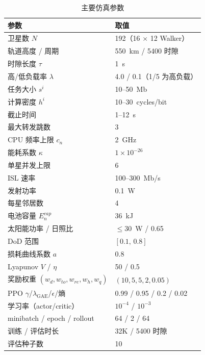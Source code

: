 \documentclass[a4paper,11pt]{article}
\begin{document}
\begin{table}[t]
\centering
\caption{主要仿真参数}
\label{tab:sim_params}
\begin{tabular}{ll}
\hline
参数 & 取值 \\
\hline
卫星数 $N$ & 192（16 $\times$ 12 Walker）\\
轨道高度 / 周期 & 550~km / 5400 时隙 \\
时隙长度 $\tau$ & 1~s \\
高/低负载率 $\lambda$ & 4.0 / 0.1（1/5 为高负载）\\
任务大小 $s^i$ & 10--50~Mb \\
计算密度 $h^i$ & 10--30~cycles/bit~\cite{zhang2024mhspo} \\
截止时间 & 1--12~s \\
最大转发跳数 & 3 \\
CPU 频率上限 $c_n$ & 2~GHz~\cite{zhang2024mhspo} \\
能耗系数 $\kappa$ & $1\times10^{-26}$~\cite{zhang2024mhspo} \\
单星并发上限 & 6 \\
ISL 速率 & 100--300~Mb/s \\
发射功率 & 0.1~W \\
每星邻居数 & 4 \\
电池容量 $E^{cap}_n$ & 36~kJ \\
太阳能功率 / 日照比 & $\le 30$~W / 0.65 \\
DoD 范围 & $[0.1,\,0.8]$ \\
损耗曲线系数 $a$ & 0.8 \\
Lyapunov $V$ / $\eta$ & 50 / 0.5 \\
奖励权重 $(w_d,w_{to},w_{re},w_h,w_q)$ & $(10,5,5,2,0.05)$ \\
PPO $\gamma$/$\lambda_{\text{GAE}}$/$\epsilon$/熵 & 0.99 / 0.95 / 0.2 / 0.02 \\
学习率（actor/critic） & $10^{-4}$ / $10^{-3}$ \\
minibatch / epoch / rollout & 64 / 2 / 64 \\
训练 / 评估时长 & 32K / 5400 时隙 \\
评估种子数 & 10 \\
\hline
\end{tabular}
\end{table}
\end{document}
